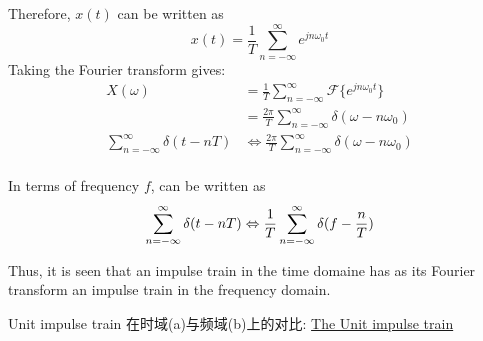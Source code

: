 \documentclass{article}
\begin{document}
Therefore, $x(t)$ can be written as
$$ x(t) = \frac{1}{T} \sum_{n = - \infty}^{\infty} e^{jn\omega_0 t} $$
Taking the Fourier transform gives:
\begin{equation}
\begin{aligned}
X(\omega)
& = \frac{1}{T} \sum_{n = -\infty}^{\infty} \mathcal{F}\{ e^{jn\omega_0 t} \} \\
& = \frac{2\pi}{T} \sum_{n = -\infty}^{\infty} \delta(\omega - n\omega_0) \\
\sum_{n = - \infty}^{\infty} \delta(t - nT)
& \Leftrightarrow
\frac{2\pi}{T} \sum_{n = -\infty}^{\infty} \delta(\omega - n\omega_0) \\
\end{aligned}
\end{equation}

In terms of frequency $f$, \lasteq can be written as
$$
\sum_{n = - \infty}^{\infty} \delta(t - nT)
\Leftrightarrow
\frac{1}{T} \sum_{n = -\infty}^{\infty} \delta(f - \dfrac{n}{T}) \\
$$

Thus, it is seen that an impulse train in the time domaine has as its Fourier transform an impulse train in the frequency domain.

Unit impulse train 在时域(a)与频域(b)上的对比:
\href{http://i.imgbox.com/GHbA7Fbm.jpg}{The Unit impulse train}
\end{document}
